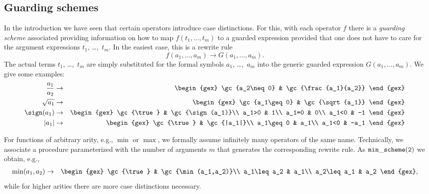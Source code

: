 \subsection{Guarding schemes}
In the introduction we have seen that certain operators introduce case
distinctions. For this, with each operator $f$ there is a {\em
guarding scheme} associated providing information on how to map
$f(t_1,\ldots,t_m)$ to a guarded expression provided that one does not
have to care for the argument expressions $t_1$, \dots,~$t_m$. In the
easiest case, this is a rewrite rule
$$
f(a_1,\ldots,a_m)\to G(a_1,\ldots,a_m).
$$
The actual terms $t_1$, \dots,~$t_m$ are simply substituted for the
formal symbols $a_1$, \dots,~$a_m$ into the generic guarded expression
$G(a_1,\ldots,a_m)$. We give some examples:
\begin{eqnarray}
\frac{a_1}{a_2} & \to &
\begin{gex}
\gc{a_2\neq 0} & \gc{\frac{a_1}{a_2}}
\end{gex}\nonumber\\
\sqrt{a_1} & \to &
\begin{gex}
\gc{a_1\geq 0} & \gc{\sqrt{a_1}}
\end{gex}\nonumber\\
\sign(a_1) & \to &
\begin{gex}
\gc{\true} & \gc{\sign(a_1)}\\
a_1>0 & 1\\
a_1=0 & 0\\
a_1<0 & -1
\end{gex}\nonumber\\
|a_1| & \to &
\begin{gex}
\gc{\true} & \gc{|a_1|}\\
a_1\geq0 & a_1\\
a_1<0 & -a_1
\end{gex}\label{absrewrite}
\end{eqnarray}

For functions of arbitrary arity, e.g., $\min$ or $\max$, we formally
assume infinitely many operators of the same name. Technically, we
associate a procedure parameterized with the number of arguments $m$
that generates the corresponding rewrite rule. As ${\tt
min\_scheme(2)}$ we obtain, e.g.,
\begin{eqnarray}
\min(a_1,a_2) & \to &
\begin{gex}
\gc{\true} & \gc{\min(a_1,a_2)}\\
a_1\leq a_2 & a_1\\
a_2\leq a_1 & a_2
\end{gex}\label{binminscheme},
\end{eqnarray}
while for higher arities there are more case distinctions necessary.

